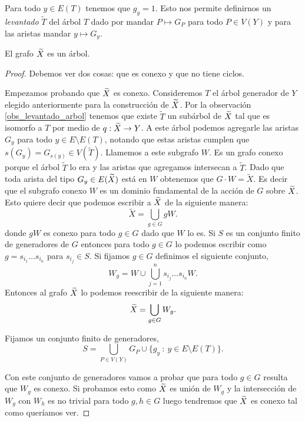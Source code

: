 \documentclass[tesis.tex]{subfiles}
\begin{document}

\begin{obs}\label{obs_levantado_arbol}
	Para todo $y \in E(T)$ tenemos que $g_y=1$. 
	Esto nos permite definirnos un \emph{levantado} $\widetilde{T}$ del árbol $T$ dado por mandar $P \mapsto  G_P$ para todo $P \in V(Y)$ y para las aristas mandar $y \mapsto  G_y$. 
\end{obs}

\begin{teo}[Serre]
	El grafo $\widetilde X$ es un árbol.
\end{teo}
\begin{proof}
	Debemos ver dos cosas: que es conexo y que no tiene ciclos.
	
	Empezamos probando que $\widetilde X$ es conexo.
	Consideremos $T$ el árbol generador de $Y$ elegido anteriormente para la construcción de $\widetilde X$. 
	Por la observación \ref{obs_levantado_arbol} tenemos que existe $\widetilde T$ un subárbol de $\widetilde X$ tal que es isomorfo a $T$ por medio de $q:\widetilde X \to Y$.
	A este árbol podemos agregarle las aristas $G_{y}$ para todo $y \in E \setminus E(T)$, notando que estas aristas cumplen que $s(G_{y}) = G_{s(y)} \in V(\widetilde T)$.
	Llamemos a este subgrafo $W$.
	Es un grafo conexo porque el árbol $\widetilde T$ lo era y las aristas que agregamos  intersecan a $\widetilde T$.	
	Dado que toda arista del tipo $G_y \in E(\widetilde X)$ está en $W$ obtenemos que $G \cdot W = \tilde X$.
	Es decir que el subgrafo conexo $W$ es un dominio fundamental de la acción de $G$ sobre $\widetilde X$.
	Esto quiere decir que podemos escribir a $\widetilde X$ de la siguiente manera:
	\[
		\tilde X = \bigcup_{g \in G} gW.
	\]
	donde $gW$ es conexo para todo $g \in G$ dado que $W$ lo es.
	Si $S$ es un conjunto finito de generadores de $G$ entonces para todo $g \in G$ lo podemos escribir como $g = s_{i_1} \dots s_{i_n}$ para $s_{i_j} \in S$.
	Si fijamos $g \in G$ definimos el siguiente conjunto,
	\[
		W_{g} = W \cup \bigcup_{j=1}^{n} s_{i_{j}}\dots s_{i_{n}}W.
	\]
	Entonces al grafo $\widetilde X$ lo podemos reescribir de la siguiente manera:
	\[
		\widetilde X =  \bigcup_{g \in G} W_{g}.
	\]
		
	
	Fijamos un conjunto finito de generadores, 
	\[
		S = \bigcup_{P \in V(Y)} G_{P} \cup \{ g_y \ : \ y \in E \setminus E(T) \}.   
	\] 
	
	Con este conjunto de generadores vamos a probar que para todo $g \in G$ resulta que $W_{g}$ es conexo.
	Si probamos esto como $\widetilde X$ es unión de $W_{g}$ y la intersección de $W_{g}$ con $W_{h}$ es no trivial para todo $g, h \in G$ luego tendremos que $\widetilde X$ es conexo tal como queríamos ver.
		

\end{proof}
\end{document}
